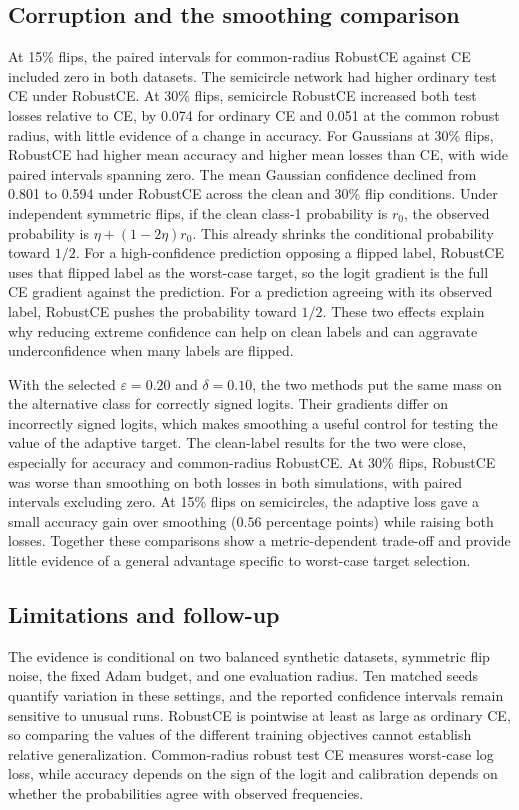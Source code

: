 \documentclass[11pt,a4paper]{article}
\begin{document}
\subsection{Corruption and the smoothing comparison}
At 15\% flips, the paired intervals for common-radius RobustCE against CE
included zero in both datasets. The semicircle network had higher ordinary
test CE under RobustCE. At 30\% flips, semicircle RobustCE increased both
test losses relative to CE, by 0.074 for ordinary CE and 0.051 at the
common robust radius, with little evidence of a change in accuracy.
For Gaussians at 30\% flips, RobustCE had higher mean accuracy and higher
mean losses than CE, with wide paired intervals spanning zero. The mean
Gaussian confidence declined from 0.801 to 0.594 under RobustCE across
the clean and 30\% flip conditions.
Under independent symmetric flips, if the clean class-1 probability is $r_0$,
the observed probability is $\eta+(1-2\eta)r_0$. This already shrinks the
conditional probability toward $1/2$. For a high-confidence prediction
opposing a flipped label, RobustCE uses that flipped label as the worst-case
target, so the logit gradient is the full CE gradient against the prediction.
For a prediction agreeing with its observed label, RobustCE pushes the
probability toward $1/2$. These two effects explain why reducing extreme
confidence can help on clean labels and can aggravate underconfidence when
many labels are flipped.

With the selected $\varepsilon=0.20$ and $\delta=0.10$, the two methods
put the same mass on the alternative class for correctly signed logits.
Their gradients differ on incorrectly signed logits, which makes
smoothing a useful control for testing the value of the adaptive target.
The clean-label results for the two were close, especially for accuracy
and common-radius RobustCE. At 30\% flips, RobustCE was worse than
smoothing on both losses in both simulations, with paired intervals
excluding zero. At 15\% flips on semicircles, the adaptive loss gave a
small accuracy gain over smoothing ($0.56$ percentage points) while
raising both losses. Together these comparisons show a metric-dependent
trade-off and provide little evidence of a general advantage specific
to worst-case target selection.

\subsection{Limitations and follow-up}
The evidence is conditional on two balanced synthetic datasets, symmetric
flip noise, the fixed Adam budget, and one evaluation radius. Ten matched
seeds quantify variation in these settings, and the reported confidence
intervals remain sensitive to unusual runs. RobustCE is pointwise at least as
large as ordinary CE, so comparing the values of the different training
objectives cannot establish relative generalization. Common-radius robust
test CE measures worst-case log loss, while accuracy depends on the sign of
the logit and calibration depends on whether the probabilities agree with
observed frequencies.
\end{document}
